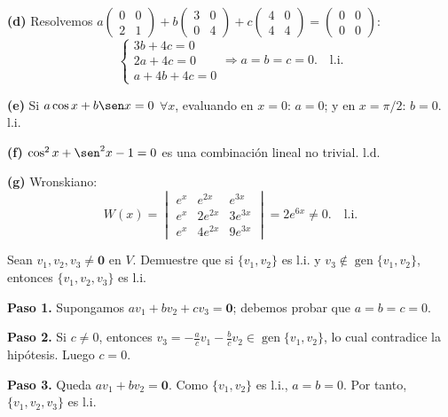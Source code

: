 \begin{prob}
\begin{myproof}
\textbf{(d)} Resolvemos $a\begin{pmatrix}0&0\\2&1\end{pmatrix} + b\begin{pmatrix}3&0\\0&4\end{pmatrix} + c\begin{pmatrix}4&0\\4&4\end{pmatrix} = \begin{pmatrix}0&0\\0&0\end{pmatrix}$:
$$\begin{cases} 3b + 4c = 0 \\ 2a + 4c = 0 \\ a + 4b + 4c = 0 \end{cases} \Rightarrow a=b=c=0.\quad \boxed{\text{l.i.}}$$

\textbf{(e)} Si $a\cos x + b\sen x = 0$ $\forall x$, evaluando en $x=0$: $a=0$; y en $x=\pi/2$: $b=0$. $\boxed{\text{l.i.}}$

\textbf{(f)} $\cos^2x + \sen^2x - 1 = 0$ es una combinación lineal no trivial. $\boxed{\text{l.d.}}$

\textbf{(g)} Wronskiano:
$$W(x) = \begin{vmatrix}
e^x & e^{2x} & e^{3x} \\
e^x & 2e^{2x} & 3e^{3x} \\
e^x & 4e^{2x} & 9e^{3x}
\end{vmatrix} = 2e^{6x} \neq 0.\quad \boxed{\text{l.i.}}$$
\end{myproof}
\end{prob}

\begin{prob} Sean $v_1,v_2,v_3 \neq \mathbf{0}$ en $V$. Demuestre que si $\{v_1,v_2\}$ es l.i. y $v_3 \notin \operatorname{gen}\{v_1,v_2\}$, entonces $\{v_1,v_2,v_3\}$ es l.i.

\begin{myproof}
\textbf{Paso 1.} Supongamos $a v_1 + b v_2 + c v_3 = \mathbf{0}$; debemos probar que $a=b=c=0$.

\textbf{Paso 2.} Si $c \neq 0$, entonces $v_3 = -\tfrac{a}{c}v_1 - \tfrac{b}{c}v_2 \in \operatorname{gen}\{v_1,v_2\}$, lo cual contradice la hipótesis. Luego $c=0$.

\textbf{Paso 3.} Queda $a v_1 + b v_2 = \mathbf{0}$. Como $\{v_1,v_2\}$ es l.i., $a=b=0$. Por tanto, $\{v_1,v_2,v_3\}$ es l.i.
\end{myproof}
\end{prob}

